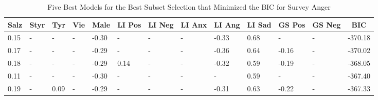 \documentclass[
  english,
  jou,floatsintext]{apa7}
\begin{document}
\begin{table}[h]

\begin{center}
\begin{threeparttable}

\caption{\label{tab:subset-detail-2}Five Best Models for the Best Subset Selection that Minimized the BIC for Survey Anger}

\small{

\begin{tabular}{lllllllllllll}
\toprule
Salz & \multicolumn{1}{c}{Styr} & \multicolumn{1}{c}{Tyr} & \multicolumn{1}{c}{Vie} & \multicolumn{1}{c}{Male} & \multicolumn{1}{c}{LI Pos} & \multicolumn{1}{c}{LI Neg} & \multicolumn{1}{c}{LI Anx} & \multicolumn{1}{c}{LI Ang} & \multicolumn{1}{c}{LI Sad} & \multicolumn{1}{c}{GS Pos} & \multicolumn{1}{c}{GS Neg} & \multicolumn{1}{c}{BIC}\\
\midrule
0.15 & - & - & - & -0.30 & - & - & - & -0.33 & 0.68 & - & - & -370.18\\
0.17 & - & - & - & -0.29 & - & - & - & -0.36 & 0.64 & -0.16 & - & -370.02\\
0.18 & - & - & - & -0.29 & 0.14 & - & - & -0.32 & 0.59 & -0.19 & - & -368.05\\
0.11 & - & - & - & -0.30 & - & - & - & - & 0.59 & - & - & -367.40\\
0.19 & - & 0.09 & - & -0.29 & - & - & - & -0.31 & 0.63 & -0.22 & - & -367.33\\
\bottomrule
\end{tabular}

}

\end{threeparttable}
\end{center}

\end{table}
\end{document}
